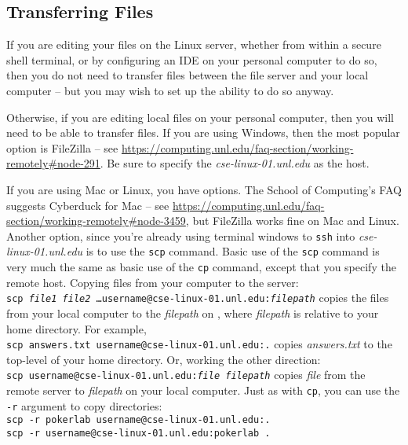 \subsection{Transferring Files}

If you are editing your files on the Linux server, whether from within a secure shell terminal, %
or by configuring an IDE on your personal computer to do so, then you do not need to transfer files between the file server and your local computer -- but you may wish to set up the ability to do so anyway.


Otherwise, if you are editing local files on your personal computer, then you will need to be able to transfer files.
If you are using Windows, then the most popular option is FileZilla -- see \url{https://computing.unl.edu/faq-section/working-remotely#node-291}.
Be sure to specify the \textit{cse-linux-01.unl.edu} as the host.

If you are using Mac or Linux, you have options.
The School of Computing's FAQ suggests Cyberduck for Mac -- see \url{https://computing.unl.edu/faq-section/working-remotely#node-3459}, but FileZilla works fine on Mac and Linux.
Another option, since you're already using terminal windows to \texttt{ssh} into \textit{cse-linux-01.unl.edu} is to use the \texttt{scp} command.
Basic use of the \texttt{scp} command is very much the same as basic use of the \texttt{cp} command, except that you specify the remote host.
Copying files from your computer to the server: \\
\texttt{scp \textit{file1} \textit{file2} \dots username@cse-linux-01.unl.edu:\textit{filepath}} copies the files from your local computer to the \textit{filepath} on \runtimeenvironment, where \textit{filepath} is relative to your home directory.
For example, \\
\texttt{scp answers.txt username@cse-linux-01.unl.edu:.} copies \textit{answers.txt} to the top-level of your home directory.
Or, working the other direction: \\
\texttt{scp username@cse-linux-01.unl.edu:\textit{file} \textit{filepath}} copies \textit{file} from the remote server to \textit{filepath} on your local computer.
Just as with \texttt{cp}, you can use the \texttt{-r} argument to copy directories: \\
\texttt{scp -r pokerlab username@cse-linux-01.unl.edu:.} \\
\texttt{scp -r username@cse-linux-01.unl.edu:pokerlab .}
